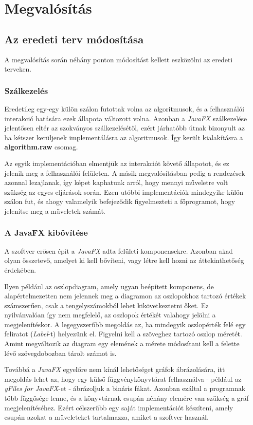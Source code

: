 \documentclass{elteikthesis}
\begin{document}
\section{Megvalósítás}
\subsection{Az eredeti terv módosítása}
A megvalósítás során néhány ponton módosítást kellett eszközölni az eredeti terveken.
\subsubsection{Szálkezelés}
Eredetileg egy-egy külön szálon futottak volna az algoritmusok, és a felhasználói interakció hatására ezek állapota változott volna. Azonban a \emph{JavaFX} szálkezelése jelentősen eltér az szokványos szálkezelésétől, ezért járhatóbb útnak bizonyult az ha kétszer kerüljenek implementálásra az algoritmusok. Így került kialakításra a \textbf{algorithm.raw} csomag.\par
 Az egyik implementációban elmentjük az interakciót követő állapotot, és ez jelenik meg a felhasználói felületen. A másik megvalósításban pedig a rendezések azonnal lezajlanak, így képet kaphatunk arról, hogy mennyi műveletre volt szükség az egyes eljárások során. Ezen utóbbi implementációk mindegyike külön szálon fut, és ahogy valamelyik befejeződik figyelmezteti a főprogramot, hogy jelenítse meg a műveletek számát.
\subsubsection{A JavaFX kibővítése}
A szoftver erősen épít a \emph{JavaFX} adta felületi komponensekre. Azonban akad olyan összetevő, amelyet ki kell bővíteni, vagy létre kell hozni az áttekinthetőség érdekében.\par
Ilyen például az oszlopdiagram, amely ugyan beépített komponens, de alapértelmezetten nem jelennek meg a diagramon az oszlopokhoz tartozó értékek számszerűen, csak a tengelyszámokból lehet kikövetkeztetni őket. Ez nyilvánvalóan így nem megfelelő, az oszlopok értékét valahogy jelölni a megjelenítéskor. A legegyszerűbb megoldás az, ha mindegyik oszlopérték felé egy feliratot (\emph{Label}-t) helyezünk el. Figyelni kell a szöveghez tartozó oszlop méretét. Amint megváltozik az diagram egy elemének a mérete módosítani kell a felette lévő szövegdobozban tárolt számot is.\par
Továbbá a \emph{JavaFX} egyelőre nem kínál lehetőséget gráfok ábrázolására, itt megoldás lehet az, hogy egy külső függvénykönyvtárat felhasználva - például az \emph{yFiles for JavaFX}-et -  ábrázoljuk a bináris fákat. Azonban ezáltal a programnak több függősége lenne, és a könyvtárnak csupán néhány elemére van szükség a gráf megjelenítéséhez. Ezért célszerűbb egy saját implementációt készíteni, amely csupán azokat a műveleteket tartalmazza, amiket a szoftver használ.
\end{document}

